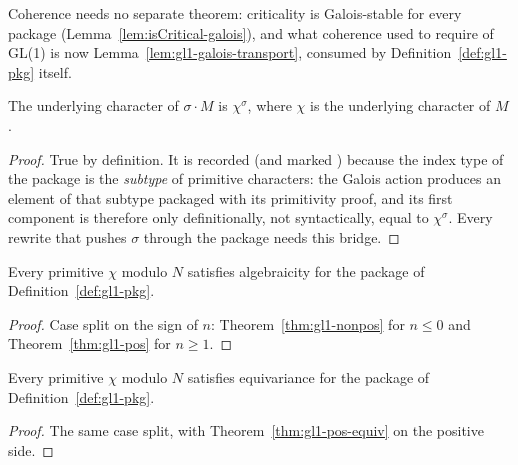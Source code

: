 Coherence needs no separate theorem: criticality is Galois-stable for every package
(Lemma~\ref{lem:isCritical-galois}), and what coherence used to require of GL(1) is now
Lemma~\ref{lem:gl1-galois-transport}, consumed by Definition~\ref{def:gl1-pkg} itself.

\begin{lemma}
  \label{lem:pkg-galoisAction-coe}
  \leanok
  The underlying character of $\sigma \cdot M$ is $\chi^{\sigma}$, where $\chi$ is the
  underlying character of $M$.
\end{lemma}
\begin{proof}
  \leanok
  True by definition. It is recorded (and marked ) because the index type of the
  package is the \emph{subtype} of primitive characters: the Galois action produces an element
  of that subtype packaged with its primitivity proof, and its first component is therefore
  only definitionally, not syntactically, equal to $\chi^{\sigma}$. Every rewrite that pushes
  $\sigma$ through the package needs this bridge.
\end{proof}

\begin{lemma}
  \label{lem:gl1-arithmetic-pkg}
  \leanok
  Every primitive $\chi$ modulo $N$ satisfies algebraicity for the package of
  Definition~\ref{def:gl1-pkg}.
\end{lemma}
\begin{proof}
  \leanok
  Case split on the sign of $n$: Theorem~\ref{thm:gl1-nonpos} for $n \leq 0$ and
  Theorem~\ref{thm:gl1-pos} for $n \geq 1$.
\end{proof}

\begin{lemma}
  \label{lem:gl1-equivariant-pkg}
  \leanok
  Every primitive $\chi$ modulo $N$ satisfies equivariance for the package of
  Definition~\ref{def:gl1-pkg}.
\end{lemma}
\begin{proof}
  \leanok
  The same case split, with Theorem~\ref{thm:gl1-pos-equiv} on the positive side.
\end{proof}

